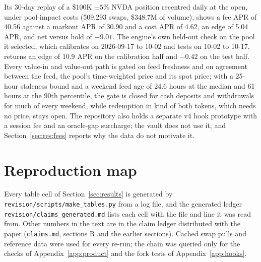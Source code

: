\documentclass[11pt]{article}
\newcommand{\USD}{\$}
\begin{document}
Its 30-day replay of a \USD100K $\pm5\%$ NVDA position recentred daily at the open, under pool-impact costs (509,293 swaps, \USD348.7M of volume), shows a fee APR of 40.56 against a markout APR of 30.90 and a cost APR of 4.62, an edge of 5.04 APR, and net versus hold of $-9.01$. The engine's own held-out check on the pool it selected, which calibrates on 2026-09-17 to 10-02 and tests on 10-02 to 10-17, returns an edge of 10.9 APR on the calibration half and $-0.42$ on the test half. Every value-in and value-out path is gated on feed freshness and on agreement between the feed, the pool's time-weighted price and its spot price; with a 25-hour staleness bound and a weekend feed age of 24.6 hours at the median and 61 hours at the 90th percentile, the gate is closed for cash deposits and withdrawals for much of every weekend, while redemption in kind of both tokens, which needs no price, stays open. The repository also holds a separate v4 hook prototype with a session fee and an oracle-gap surcharge; the vault does not use it, and Section~\ref{sec:res:fees} reports why the data do not motivate it.

\section{Reproduction map}\label{app:repro}

Every table cell of Section~\ref{sec:results} is generated by \texttt{revision/scripts/make\_tables.py} from a log file, and the generated ledger \texttt{revision/claims\_generated.md} lists each cell with the file and line it was read from. Other numbers in the text are in the claim ledger distributed with the paper (\texttt{claims.md}, sections R and the earlier sections). Cached swap pulls and reference data were used for every re-run; the chain was queried only for the checks of Appendix~\ref{app:product} and the fork tests of Appendix~\ref{app:hooks}.
\end{document}
